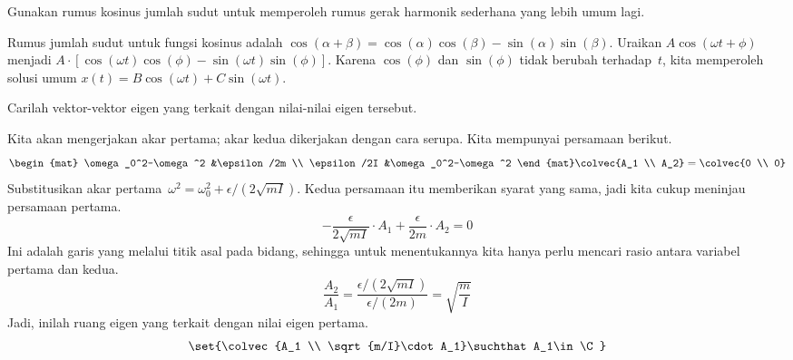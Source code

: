 \begin{exercises}
\item Gunakan rumus kosinus jumlah sudut untuk memperoleh rumus gerak
  harmonik sederhana yang lebih umum lagi.
  \begin{answer}
    Rumus jumlah sudut untuk fungsi kosinus adalah
    $\cos(\alpha+\beta)=\cos(\alpha)\cos(\beta)-\sin(\alpha)\sin(\beta)$.
    Uraikan $A\cos(\omega t+\phi)$ menjadi $A\cdot[\cos(\omega
    t)\cos(\phi)-\sin(\omega t)\sin(\phi)]$.  Karena $\cos(\phi)$ dan
    $\sin(\phi)$ tidak berubah terhadap~$t$, kita memperoleh solusi umum
    $x(t)=B\cos(\omega t)+C\sin(\omega t)$.
  \end{answer}
\item Carilah vektor-vektor eigen yang terkait dengan nilai-nilai eigen tersebut.
  \begin{answer}
    Kita akan mengerjakan akar pertama; akar kedua dikerjakan dengan cara serupa.  
    Kita mempunyai persamaan berikut.
    \begin{equation*}
      \begin{mat}
        \omega_0^2-\omega^2  &\epsilon/2m \\
        \epsilon/2I         &\omega_0^2-\omega^2
      \end{mat}
      \colvec{A_1 \\ A_2}
      =\colvec{0 \\ 0}
    \end{equation*}
    Substitusikan akar pertama~$\omega^2=\omega_0^2+\epsilon/(2\sqrt{mI})$.
    Kedua persamaan itu memberikan syarat yang sama, jadi kita cukup meninjau persamaan pertama.
    \begin{equation*}
      -\frac{\epsilon}{2\sqrt{mI}}\cdot A_1+\frac{\epsilon}{2m}\cdot A_2=0
    \end{equation*}
    Ini adalah garis yang melalui titik asal pada bidang, sehingga untuk menentukannya kita
    hanya perlu mencari rasio antara variabel pertama dan kedua.
    \begin{equation*}
      \frac{A_2}{A_1}=\frac{\epsilon/(2\sqrt{mI})}{\epsilon/(2m)}
                     =\sqrt{\frac{m}{I}}
    \end{equation*}
    Jadi, inilah ruang eigen yang terkait dengan nilai eigen pertama.
    \begin{equation*}
      \set{\colvec{A_1 \\ \sqrt{m/I}\cdot A_1}\suchthat A_1\in\C}
    \end{equation*}
  \end{answer}

\end{exercises}
